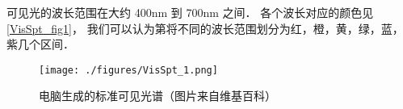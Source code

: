 
可见光的波长范围在大约 400nm 到 700nm 之间． 各个波长对应的颜色见\autoref{VisSpt_fig1}， 我们可以认为第将不同的波长范围划分为红，橙，黄，绿，蓝，紫几个区间．

\begin{figure}[ht]
\centering
\texttt{[image: ./figures/VisSpt\_1.png]}
\caption{电脑生成的标准可见光谱（图片来自维基百科）} \label{VisSpt_fig1}
\end{figure}
